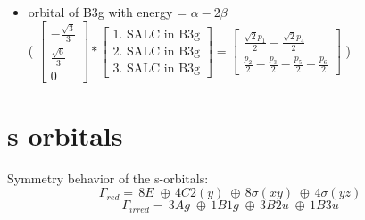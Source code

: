 \documentclass[12pt,a4paper]{article}
\begin{document}
\begin{itemize}
                            ( $\left[\begin{matrix}1\end{matrix}\right] * \left[\begin{array}{c}\text{1. SALC in Au}\end{array}\right] = \left[\begin{matrix}\frac{p_{2}}{2} - \frac{p_{3}}{2} + \frac{p_{5}}{2} - \frac{p_{6}}{2}\end{matrix}\right] $ )
\item orbital of B3g with energy = $\alpha - 2 \beta$ \\
                            ( $\left[\begin{matrix}- \frac{\sqrt{3}}{3}\\\frac{\sqrt{6}}{3}\\0\end{matrix}\right] * \left[\begin{array}{c}\text{1. SALC in B3g} \\ \text{2. SALC in B3g} \\ \text{3. SALC in B3g}\end{array}\right] = \left[\begin{matrix}\frac{\sqrt{2} p_{1}}{2} - \frac{\sqrt{2} p_{4}}{2}\\\frac{p_{2}}{2} - \frac{p_{3}}{2} - \frac{p_{5}}{2} + \frac{p_{6}}{2}\end{matrix}\right] $ )
\end{itemize}



\newpage \section*{s orbitals}
Symmetry behavior of the s-orbitals:
$$\Gamma_{red} = \,8 E\;\oplus{}\,4 C2(y)\;\oplus{}\,8 \sigma (xy)\;\oplus{}\,4 \sigma (yz)\;$$
$$\Gamma_{irred} = \,3 Ag\;\oplus{}\,1 B1g\;\oplus{}\,3 B2u\;\oplus{}\,1 B3u\;$$
\end{document}
